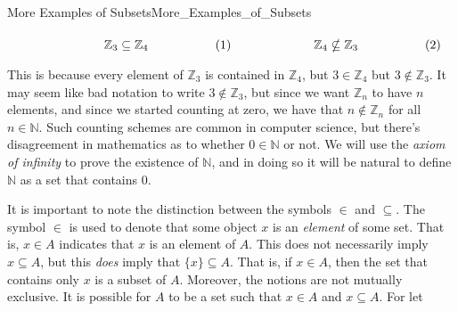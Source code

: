 \begin{fexample}{More Examples of Subsets}{More_Examples_of_Subsets}
            \par\hfill\par
            \begin{subequations}
                \begin{minipage}[b]{0.49\textwidth}
                    \begin{equation}
                        \mathbb{Z}_{3}\subseteq\mathbb{Z}_{4}
                    \end{equation}
                \end{minipage}
                \hfill
                \begin{minipage}[b]{0.49\textwidth}
                    \begin{equation}
                        \mathbb{Z}_{4}\nsubseteq\mathbb{Z}_{3}
                    \end{equation}
                \end{minipage}
            \end{subequations}
            \par\vspace{2.5ex}
            This is because every element of $\mathbb{Z}_{3}$ is contained in
            $\mathbb{Z}_{4}$, but $3\in\mathbb{Z}_{4}$ but
            $3\notin\mathbb{Z}_{3}$. It may seem like bad notation to write
            $3\notin\mathbb{Z}_{3}$, but since we want $\mathbb{Z}_{n}$ to have
            $n$ elements, and since we started counting at zero, we have that
            $n\notin\mathbb{Z}_{n}$ for all $n\in\mathbb{N}$. Such counting
            schemes are common in computer science, but there's disagreement in
            mathematics as to whether $0\in\mathbb{N}$ or not. We will use the
            \textit{axiom of infinity} to prove the existence of $\mathbb{N}$,
            and in doing so it will be natural to define $\mathbb{N}$ as a set
            that contains $0$.
        \end{fexample}
        It is important to note the distinction between the symbols $\in$ and
        $\subseteq$. The symbol $\in$ is used to denote that some object $x$ is
        an \textit{element} of some set. That is, $x\in{A}$ indicates that $x$
        is an element of $A$. This does not necessarily imply $x\subseteq{A}$,
        but this \textit{does} imply that $\{x\}\subseteq{A}$. That is, if
        $x\in{A}$, then the set that contains only $x$ is a subset of $A$.
        Moreover, the notions are not mutually exclusive. It is possible for $A$
        to be a set such that $x\in{A}$ and $x\subseteq{A}$. For let

